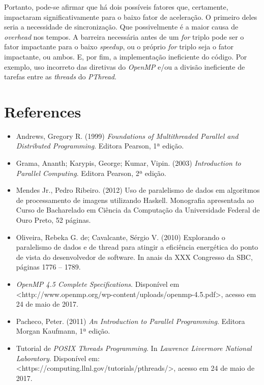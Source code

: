 \documentclass[12pt]{article}
\begin{document}
Portanto, pode-se afirmar que há dois possíveis fatores que, certamente, impactaram significativamente para o baixo fator de aceleração. O primeiro deles seria a necessidade de sincronização. Que possivelmente é a maior causa de \textit{overhead} nos tempos. A barreira necessária antes de um \textit{for} triplo pode ser o fator impactante para o baixo \textit{speedup}, ou o próprio \textit{for} triplo seja o fator impactante, ou ambos. E, por fim, a implementação ineficiente do código. Por exemplo, uso incorreto das diretivas do \textit{OpenMP} e/ou a divisão ineficiente de tarefas entre as \textit{threads} do \textit{PThread}.
 

\section{References}

\begin{itemize}
	\item Andrews, Gregory R. (1999)  \textit{Foundations of Multithreaded Parallel and Distributed Programming}. Editora Pearson, 1ª edição.
	\item Grama, Ananth; Karypis, George; Kumar, Vipin. (2003) \textit{Introduction to Parallel Computing}. Editora Pearson, 2ª edição.
    \item Mendes Jr., Pedro Ribeiro. (2012) Uso de paralelismo de dados em algoritmos de processamento de imagens utilizando Haskell. Monografia apresentada ao Curso de Bacharelado em Ciência da Computação da Universidade Federal de Ouro Preto, 52 páginas.
    \item Oliveira, Rebeka G. de; Cavalcante, Sérgio V. (2010) Explorando o paralelismo de dados e de thread para atingir a eficiência energética do ponto de vista do desenvolvedor de software. In anais da XXX Congresso da SBC, páginas 1776 -- 1789.
    \item \textit{OpenMP 4.5 Complete Specifications}. Disponível em <http://www.openmp.org/wp-content/uploads/openmp-4.5.pdf>, acesso em 24 de maio de 2017.
    \item Pacheco, Peter. (2011) \textit{An Introduction to Parallel Programming}. Editora Morgan Kaufmann, 1ª edição.
    \item Tutorial de \textit{POSIX Threads Programming}. In \textit{Lawrence Livermore National Laboratory}. Disponível em: <https://computing.llnl.gov/tutorials/pthreads/>, acesso em 24 de maio de 2017.
\end{itemize}


\end{document}
